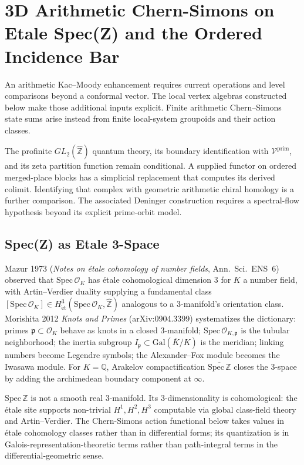 \chapter{3D Arithmetic Chern-Simons on Etale Spec(Z) and the Ordered Incidence Bar}
\label{v4-arith:3d-acs-E1bar}

An arithmetic Kac--Moody enhancement requires current operations
and level comparisons beyond a conformal vector. The local vertex
algebras constructed below make those additional inputs explicit.
Finite arithmetic Chern--Simons state sums arise instead from
finite local-system groupoids and their action classes.

The profinite \(GL_2(\widehat{\mathbb Z})\) quantum theory, its
boundary identification with \(\mathcal V^{\mathrm{prim}}\), and
its zeta partition function remain conditional. A supplied functor
on ordered merged-place blocks has a simplicial replacement that
computes its derived colimit. Identifying that complex with geometric
arithmetic chiral homology is a further comparison.
The associated Deninger construction requires a spectral-flow
hypothesis beyond its explicit prime-orbit model.

\section{Spec(Z) as Etale 3-Space}
\label{v4-arith:3d-acs:spec-z}

Mazur 1973 (\emph{Notes on étale cohomology of number fields},
Ann.~Sci.~ENS~6) observed that \(\mathrm{Spec}\,\mathcal{O}_K\) has étale
cohomological dimension \(3\) for \(K\) a number field, with Artin--Verdier
duality supplying a fundamental class
\([\mathrm{Spec}\,\mathcal{O}_K]\in H^{3}_{\mathrm{\acute{e}t}}(\mathrm{Spec}\,\mathcal{O}_K,\widehat{\mathbb{Z}})\)
analogous to a 3-manifold's orientation class. Morishita 2012
\emph{Knots and Primes} (arXiv:0904.3399) systematizes the dictionary:
primes \(\mathfrak{p}\subset\mathcal{O}_K\) behave as knots in a closed
\(3\)-manifold; \(\mathrm{Spec}\,\mathcal{O}_{K,\mathfrak{p}}\) is the
tubular neighborhood; the inertia subgroup \(I_{\mathfrak{p}}\subset\mathrm{Gal}(\overline{K}/K)\)
is the meridian; linking numbers become Legendre symbols; the
Alexander--Fox module becomes the Iwasawa module. For \(K=\mathbb{Q}\),
Arakelov compactification \(\overline{\mathrm{Spec}\,\mathbb{Z}}\) closes
the 3-space by adding the archimedean boundary component at \(\infty\).

\begin{remark}
\label{v4-arith:3d-acs:rem:cohom-3dim}
\(\mathrm{Spec}\,\mathbb{Z}\) is not a smooth real 3-manifold. Its
3-dimensionality is cohomological: the étale site supports non-trivial
\(H^1,H^2,H^3\) computable via global class-field theory and
Artin--Verdier. The Chern-Simons action functional below takes values
in étale cohomology classes rather than in differential forms; its
quantization is in Galois-representation-theoretic terms rather than
path-integral terms in the differential-geometric sense.
\end{remark}

